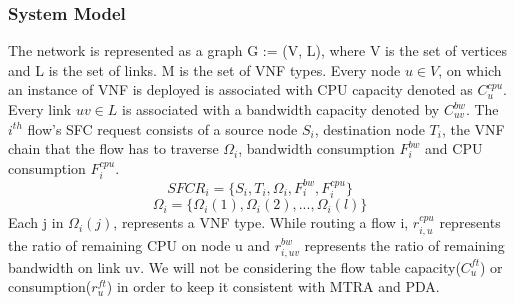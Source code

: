 \subsubsection{System Model}
The network is represented as a graph G := (V, L), where V is the set of vertices and L is the set of links. M is the set of VNF types. Every node $u \in V$, on which an instance of VNF is deployed is associated with CPU capacity denoted as $C_u^{cpu}$. Every link $uv \in L$ is associated with a bandwidth capacity denoted by $C_{uv}^{bw}$. The $i^{th}$ flow's SFC request consists of a source node $S_i$, destination node $T_i$, the VNF chain that the flow has to traverse $\Omega_i$, bandwidth consumption $F_i^{bw}$ and CPU consumption $F_i^{cpu}$.\\
$$SFCR_i = \{S_i, T_i, \Omega_i, F_i^{bw}, F_i^{cpu}\}$$
$$\Omega_i = \{\Omega_i(1), \Omega_i(2), ..., \Omega_i(l)\}$$
Each j in $\Omega_i(j)$, represents a VNF type. While routing a flow i, $r_{i,u}^{cpu}$ represents the ratio of remaining CPU on node u and $r_{i,uv}^{bw}$ represents the ratio of remaining bandwidth on link uv. We will not be considering the flow table capacity($C_u^{ft}$) or consumption($r_u^{ft}$) in order to keep it consistent with MTRA and PDA.

